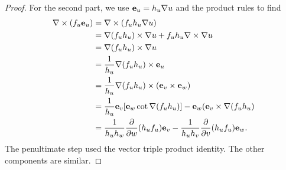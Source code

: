 \documentclass[10pt, a4paper]{article}
\begin{document}
\begin{proposition}
\begin{proof}
        For the second part,
        we use $\mathbf{e}_u = h_u\mathbf{\nabla} u$ and the product rules to find
        \begin{align*}
            \mathbf{\nabla} \times (f_u\mathbf{e}_u) &= \mathbf{\nabla} \times (f_uh_u \mathbf{\nabla} u) \\
            &= \mathbf{\nabla}(f_uh_u) \times \mathbf{\nabla} u + f_uh_u\mathbf{\nabla} \times \mathbf{\nabla} u \\
            &= \mathbf{\nabla} (f_uh_u) \times \mathbf{\nabla} u \\
            &= \frac{1}{h_u}\mathbf{\nabla}(f_uh_u) \times \mathbf{e}_u \\
            &= \frac{1}{h_u}\mathbf{\nabla}(f_uh_u) \times (\mathbf{e}_v \times \mathbf{e}_w) \\
            &= \frac{1}{h_u}\mathbf{e}_v[\mathbf{e}_w \cot \mathbf{\nabla}(f_uh_u)] - \mathbf{e}_w(\mathbf{e}_v \times \mathbf{\nabla}(f_uh_u) \\
            &= \frac{1}{h_uh_w}\frac{\partial }{\partial w}(h_uf_u)\mathbf{e}_v - \frac{1}{h_uh_v}\frac{\partial }{\partial v}(h_uf_u)\mathbf{e}_w.
        \end{align*}
        The penultimate step used the vector triple product identity.
        The other components are similar.
    \end{proof}
\end{proposition}
\end{document}
